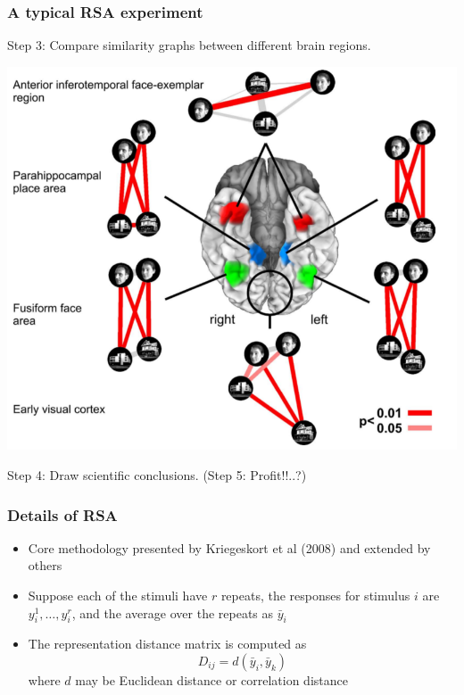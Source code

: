 \documentclass{beamer}
\begin{document}
\begin{frame}
\frametitle{A typical RSA experiment}
Step 3: Compare similarity graphs between different brain regions.
\begin{center}
\includegraphics[scale = 0.2]{k08_step3.png}
\end{center}
Step 4: Draw scientific conclusions.  (Step 5: Profit!!..?)
\end{frame}

\begin{frame}
\frametitle{Details of RSA}
\begin{itemize}
\item Core methodology presented by Kriegeskort et al (2008) and extended by others
\item Suppose each of the stimuli have $r$ repeats, the responses for stimulus $i$ are $y_i^1,\hdots, y_i^r$,
and the average over the repeats as $\bar{y}_i$
\item The representation distance matrix is computed as
\[
D_{ij} = d(\bar{y}_i, \bar{y}_k)
\] 
where $d$ may be Euclidean distance or correlation distance
\end{itemize}
\end{frame}
\end{document}
